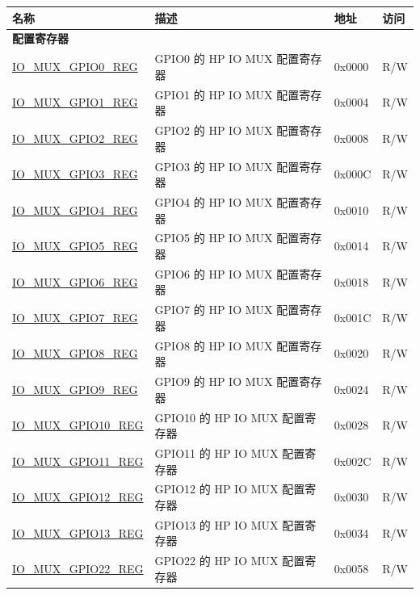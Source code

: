 \begin{longtable}{ | p{6cm} | p{7.2cm} | p{1.3cm} | p{1cm} | }
\hline\rowcolor{lightgray}
\textbf{名称} & \textbf{描述} &  \textbf{地址} & \textbf{访问} \\ \hline
\endhead
\multicolumn{4}{|l|}{\textbf{配置寄存器}} \\ \hline
\hyperref[regdesc:IOMUXGPIONREG]{IO\_MUX\_GPIO0\_REG} & GPIO0 的 HP IO MUX 配置寄存器& 0x0000 & R/W \\ \hline
\hyperref[regdesc:IOMUXGPIONREG]{IO\_MUX\_GPIO1\_REG} & GPIO1 的 HP IO MUX 配置寄存器 & 0x0004 & R/W \\ \hline
\hyperref[regdesc:IOMUXGPIONREG]{IO\_MUX\_GPIO2\_REG} & GPIO2 的 HP IO MUX 配置寄存器 & 0x0008 & R/W \\ \hline
\hyperref[regdesc:IOMUXGPIONREG]{IO\_MUX\_GPIO3\_REG} & GPIO3 的 HP IO MUX 配置寄存器 & 0x000C & R/W \\ \hline
\hyperref[regdesc:IOMUXGPIONREG]{IO\_MUX\_GPIO4\_REG} & GPIO4 的 HP IO MUX 配置寄存器 & 0x0010 & R/W \\ \hline
\hyperref[regdesc:IOMUXGPIONREG]{IO\_MUX\_GPIO5\_REG} & GPIO5 的 HP IO MUX 配置寄存器 & 0x0014 & R/W \\ \hline
\hyperref[regdesc:IOMUXGPIONREG]{IO\_MUX\_GPIO6\_REG} & GPIO6 的 HP IO MUX 配置寄存器 & 0x0018 & R/W \\ \hline
\hyperref[regdesc:IOMUXGPIONREG]{IO\_MUX\_GPIO7\_REG} & GPIO7 的 HP IO MUX 配置寄存器 & 0x001C & R/W \\ \hline
\hyperref[regdesc:IOMUXGPIONREG]{IO\_MUX\_GPIO8\_REG} & GPIO8 的 HP IO MUX 配置寄存器  & 0x0020 & R/W \\ \hline
\hyperref[regdesc:IOMUXGPIONREG]{IO\_MUX\_GPIO9\_REG} & GPIO9 的 HP IO MUX 配置寄存器  & 0x0024 & R/W \\ \hline
\hyperref[regdesc:IOMUXGPIONREG]{IO\_MUX\_GPIO10\_REG} & GPIO10 的 HP IO MUX 配置寄存器  & 0x0028 & R/W \\ \hline
\hyperref[regdesc:IOMUXGPIONREG]{IO\_MUX\_GPIO11\_REG} & GPIO11 的 HP IO MUX 配置寄存器  & 0x002C & R/W \\ \hline
\hyperref[regdesc:IOMUXGPIONREG]{IO\_MUX\_GPIO12\_REG} & GPIO12 的 HP IO MUX 配置寄存器  & 0x0030 & R/W \\ \hline
\hyperref[regdesc:IOMUXGPIONREG]{IO\_MUX\_GPIO13\_REG} & GPIO13 的 HP IO MUX 配置寄存器  & 0x0034 & R/W \\ \hline
\hyperref[regdesc:IOMUXGPIONREG]{IO\_MUX\_GPIO22\_REG} & GPIO22 的 HP IO MUX 配置寄存器  & 0x0058 & R/W \\ \hline

\end{longtable}
